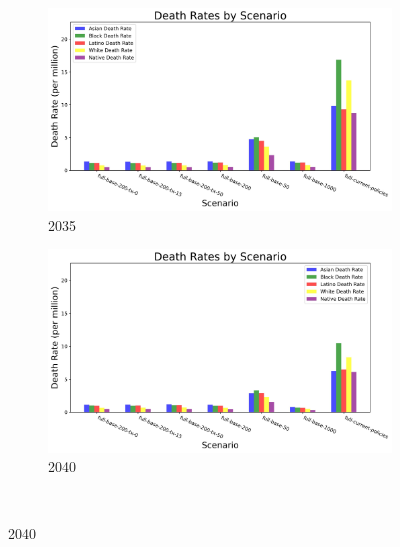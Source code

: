 \documentclass[a4paper]{article}
\theoremstyle{definition}
\theoremstyle{plain}
\begin{document}
\begin{figure}
        \begin{subfigure}[b]{0.49\textwidth}
        \includegraphics[width=\textwidth]{Figures/Output/Compare_scenarios_all-scenarios_2035_GenX.jpg}
        \caption{2035}
        \label{Subfig2}
    \end{subfigure}
    \hfill
        \begin{subfigure}[b]{0.49\textwidth}
        \includegraphics[width=\textwidth]{Figures/Output/Compare_scenarios_all-scenarios_2040_GenX.jpg}
        \caption{2040}
        \label{Subfig2}
    \end{subfigure}\\


\end{figure}
\end{document}
